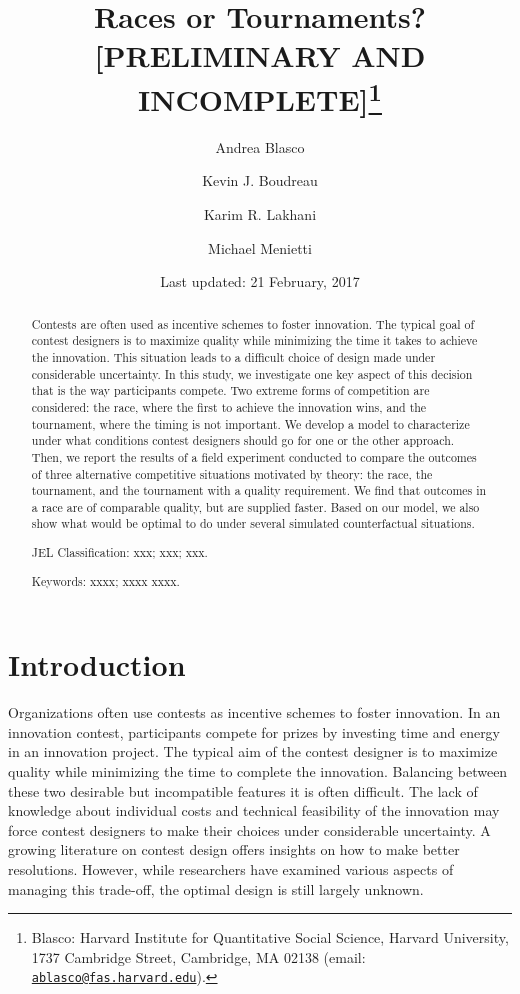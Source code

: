 \documentclass[12pt,]{article}
\title{Races or Tournaments? {[}PRELIMINARY AND INCOMPLETE{]}\thanks{Blasco: Harvard Institute for Quantitative Social Science, Harvard
University, 1737 Cambridge Street, Cambridge, MA 02138 (email:
\href{mailto:ablasco@fas.harvard.edu}{\nolinkurl{ablasco@fas.harvard.edu}}).}}
\author{Andrea Blasco \and Kevin J. Boudreau \and Karim R. Lakhani \and Michael Menietti}
\date{Last updated: 21 February, 2017}
\begin{document}
\maketitle
\begin{abstract}
Contests are often used as incentive schemes to foster innovation. The
typical goal of contest designers is to maximize quality while
minimizing the time it takes to achieve the innovation. This situation
leads to a difficult choice of design made under considerable
uncertainty. In this study, we investigate one key aspect of this
decision that is the way participants compete. Two extreme forms of
competition are considered: the race, where the first to achieve the
innovation wins, and the tournament, where the timing is not important.
We develop a model to characterize under what conditions contest
designers should go for one or the other approach. Then, we report the
results of a field experiment conducted to compare the outcomes of three
alternative competitive situations motivated by theory: the race, the
tournament, and the tournament with a quality requirement. We find that
outcomes in a race are of comparable quality, but are supplied faster.
Based on our model, we also show what would be optimal to do under
several simulated counterfactual situations.

\smallskip\noindent 
JEL Classification: xxx; xxx; xxx.

\smallskip\noindent 
Keywords: xxxx; xxxx xxxx.
\end{abstract}


\clearpage
\tableofcontents
\setcounter{tocdepth}{2}
\clearpage

\section{Introduction}\label{introduction}

Organizations often use contests as incentive schemes to foster
innovation. In an innovation contest, participants compete for prizes by
investing time and energy in an innovation project. The typical aim of
the contest designer is to maximize quality while minimizing the time to
complete the innovation. Balancing between these two desirable but
incompatible features it is often difficult. The lack of knowledge about
individual costs and technical feasibility of the innovation may force
contest designers to make their choices under considerable uncertainty.
A growing literature on contest design offers insights on how to make
better resolutions. However, while researchers have examined various
aspects of managing this trade-off, the optimal design is still largely
unknown.
\end{document}
